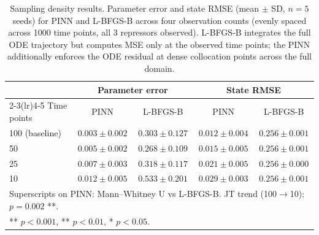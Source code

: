 \begin{table}[htbp]
\centering
\caption{Sampling density results. Parameter error and state RMSE (mean $\pm$ SD, $n = 5$ seeds) for PINN and L-BFGS-B across four observation counts (evenly spaced across 1000 time points, all 3 repressors observed). L-BFGS-B integrates the full ODE trajectory but computes MSE only at the observed time points; the PINN additionally enforces the ODE residual at dense collocation points across the full domain.}
\label{tab:exp3_sampling_density}
{\small\setlength{\tabcolsep}{5pt}%
\begin{tabular}{lcccc}
\toprule
 & \multicolumn{2}{c}{Parameter error} & \multicolumn{2}{c}{State RMSE} \\
\cmidrule(lr){2-3}\cmidrule(lr){4-5}
Time points & PINN & L-BFGS-B & PINN & L-BFGS-B \\
\midrule
100 (baseline) & $0.003 \pm 0.002$\rlap{\textsuperscript{**}} & $0.303 \pm 0.127$ & $0.012 \pm 0.004$ & $0.256 \pm 0.001$ \\
50 & $0.005 \pm 0.002$\rlap{\textsuperscript{**}} & $0.268 \pm 0.109$ & $0.015 \pm 0.005$ & $0.256 \pm 0.001$ \\
25 & $0.007 \pm 0.003$\rlap{\textsuperscript{**}} & $0.318 \pm 0.117$ & $0.021 \pm 0.005$ & $0.256 \pm 0.000$ \\
10 & $0.012 \pm 0.005$\rlap{\textsuperscript{**}} & $0.533 \pm 0.201$ & $0.029 \pm 0.003$ & $0.256 \pm 0.001$ \\
\bottomrule
\multicolumn{5}{l}{\footnotesize Superscripts on PINN: Mann--Whitney U vs L-BFGS-B. JT trend (100$\to$10): $p = 0.002$ **.} \\
\multicolumn{5}{l}{\footnotesize *** $p < 0.001$, ** $p < 0.01$, * $p < 0.05$.} \\
\end{tabular}}
\end{table}

